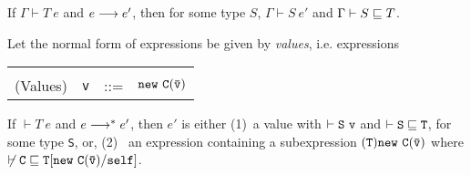 \begin{theorem} 

If $\Gamma \vdash T\ e$ and $e \derives e'$, then for some type $S$,
$\Gamma \vdash S\ e'$ and $\Gamma \vdash S \subtype T$.

\end{theorem}


Let the normal form of expressions be given by {\em values},
i.e. expressions 

\begin{tabular}{rrcl}
&&&\\
(Values) & {\tt v} &{::=}& $\new\ {\tt C(\bar{\tt v})}$
\end{tabular}


\begin{theorem} 

If $\vdash T\ e$ and $e \starderives e'$, then $e'$ is
either (1)~a value {\tt } with $\vdash {\tt S\ v}$ and $\vdash {\tt S
\subtype T}$, for some type {\tt S}, or, (2)~ an expression containing
a subexpression ${\tt (T)\new\ C(\bar{\tt v})}$ where 
$\not\vdash \tt C\subtype T[\new\ C(\bar{\tt v})/\self]$.

\end{theorem}

